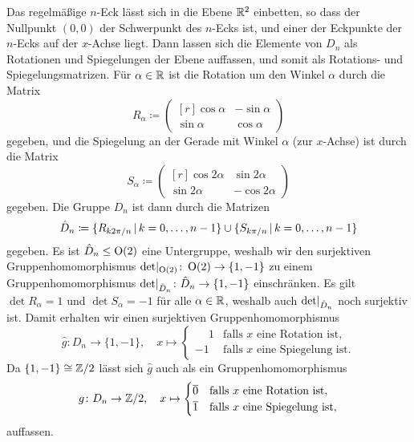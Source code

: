 Das regelmäßige $n$-Eck lässt sich in die Ebene $\mathbb{R}^2$ einbetten, so dass der Nullpunkt $(0,0)$ der Schwerpunkt des $n$-Ecks ist, und einer der Eckpunkte der $n$-Ecks auf der $x$-Achse liegt.
Dann lassen sich die Elemente von $D_n$ als Rotationen und Spiegelungen der Ebene auffassen, und somit als Rotations- und Spiegelungsmatrizen.
Für $\alpha \in \mathbb{R}$ ist die Rotation um den Winkel $\alpha$ durch die Matrix
\[
            R_\alpha
  \coloneqq \begin{pmatrix*}[r]
              \cos \alpha & -\sin \alpha  \\
              \sin \alpha &  \cos \alpha
            \end{pmatrix*}
\]
gegeben, und die Spiegelung an der Gerade mit Winkel $\alpha$ (zur $x$-Achse) ist durch die Matrix
\[
            S_\alpha
  \coloneqq \begin{pmatrix*}[r]
              \cos 2\alpha  &  \sin 2\alpha \\
              \sin 2\alpha  & -\cos 2\alpha
            \end{pmatrix*}
\]
gegeben.
Die Gruppe $D_n$ ist dann durch die Matrizen
\[
            \hat{D}_n
  \coloneqq \{
              R_{k 2\pi/n}
            \suchthat
              k = 0, \dotsc, n-1
            \}
            \cup
            \{
              S_{k \pi/n}
            \suchthat
              k = 0, \dotsc, n-1
            \}
\]
gegeben.
Es ist $\hat{D}_n \leq \operatorname{O}(2)$ eine Untergruppe, weshalb wir den surjektiven Gruppenhomomorphismus $\restrict{\det}{\orthogonal{2}} \colon \orthogonal{2} \to \{1, -1\}$ zu einem Gruppenhomomorphismus $\restrict{\det}{\hat{D}_n} \colon \hat{D}_n \to \{1,-1\}$ einschränken.
Es gilt $\det R_\alpha = 1$ und $\det S_\alpha = -1$ für alle $\alpha \in \mathbb{R}$, weshalb auch $\restrict{\det}{\hat{D}_n}$ noch surjektiv ist.
Damit erhalten wir einen surjektiven Gruppenhomomorphismus
\[
          \hat{g}
  \colon  D_n
  \to     \{1, -1\},
  \quad   x
  \mapsto \begin{cases}
            \phantom{-}1  & \text{falls $x$ eine Rotation ist}, \\
                      -1  & \text{falls $x$ eine Spiegelung ist}.
          \end{cases}
\]
Da $\{1, -1\} \cong \mathbb{Z}/2$ lässt sich $\hat{g}$ auch als ein Gruppenhomomorphismus
\[
          g
  \colon  D_n
  \to     \mathbb{Z}/2,
  \quad   x
  \mapsto \begin{cases}
            \overline{0} & \text{falls $x$ eine Rotation ist}, \\
            \overline{1} & \text{falls $x$ eine Spiegelung ist},
          \end{cases}
\]
auffassen.





